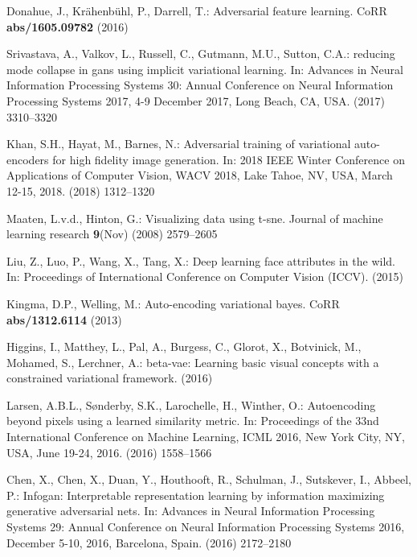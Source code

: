 \documentclass[runningheads]{llncs}
\begin{document}
\begin{thebibliography}{10}
Donahue, J., Kr{\"{a}}henb{\"{u}}hl, P., Darrell, T.:
\newblock Adversarial feature learning.
\newblock CoRR \textbf{abs/1605.09782} (2016)

Srivastava, A., Valkov, L., Russell, C., Gutmann, M.U., Sutton, C.A.:
 reducing mode collapse in gans using implicit variational
  learning.
\newblock In: Advances in Neural Information Processing Systems 30: Annual
  Conference on Neural Information Processing Systems 2017, 4-9 December 2017,
  Long Beach, CA, {USA}. (2017)  3310--3320

Khan, S.H., Hayat, M., Barnes, N.:
\newblock Adversarial training of variational auto-encoders for high fidelity
  image generation.
\newblock In: 2018 {IEEE} Winter Conference on Applications of Computer Vision,
  {WACV} 2018, Lake Tahoe, NV, USA, March 12-15, 2018. (2018)  1312--1320

Maaten, L.v.d., Hinton, G.:
\newblock Visualizing data using t-sne.
\newblock Journal of machine learning research \textbf{9}(Nov) (2008)
  2579--2605

Liu, Z., Luo, P., Wang, X., Tang, X.:
\newblock Deep learning face attributes in the wild.
\newblock In: Proceedings of International Conference on Computer Vision
  (ICCV). (2015)

Kingma, D.P., Welling, M.:
\newblock Auto-encoding variational bayes.
\newblock CoRR \textbf{abs/1312.6114} (2013)

Higgins, I., Matthey, L., Pal, A., Burgess, C., Glorot, X., Botvinick, M.,
  Mohamed, S., Lerchner, A.:
\newblock beta-vae: Learning basic visual concepts with a constrained
  variational framework.
\newblock (2016)

Larsen, A.B.L., S{\o}nderby, S.K., Larochelle, H., Winther, O.:
\newblock Autoencoding beyond pixels using a learned similarity metric.
\newblock In: Proceedings of the 33nd International Conference on Machine
  Learning, {ICML} 2016, New York City, NY, USA, June 19-24, 2016. (2016)
  1558--1566

Chen, X., Chen, X., Duan, Y., Houthooft, R., Schulman, J., Sutskever, I.,
  Abbeel, P.:
\newblock Infogan: Interpretable representation learning by information
  maximizing generative adversarial nets.
\newblock In: Advances in Neural Information Processing Systems 29: Annual
  Conference on Neural Information Processing Systems 2016, December 5-10,
  2016, Barcelona, Spain. (2016)  2172--2180


\end{thebibliography}
\end{document}

